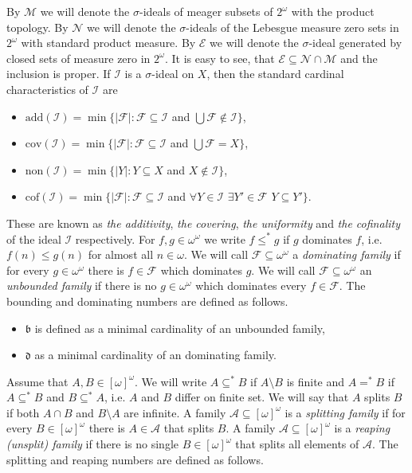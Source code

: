 \documentclass[a4paper]{amsart}
\newcommand{\bbb}{\mathfrak{b}}
\newcommand{\ddd}{\mathfrak{d}}
\newcommand{\Meager}{\mathcal{M}}
\newcommand{\Null}{\mathcal{N}}
\newcommand{\E}{\mathcal{E}}
\newcommand{\Cantor}{2^{\omega}}
\newcommand{\I}{\mathcal{I}}
\begin{document}
By $\Meager$ we will denote the $\sigma$-ideals of meager subsets of $\Cantor$ with the product topology. By $\Null$ we will denote the $\sigma$-ideals of the Lebesgue measure zero sets in $\Cantor$ with standard product measure. By $\E$ we will denote the $\sigma$-ideal generated by closed sets of measure zero in $\Cantor$. It is easy to see, that $\E\subseteq\Null\cap\Meager$ and the inclusion is proper. If $\I$ is a $\sigma$-ideal on $X$, then the standard cardinal characteristics of $\I$ are
\begin{itemize}
    \item[--] $\mathrm{add}(\I)=\min\{|\mathcal{F}|:\mathcal{F}\subseteq\I$ and $\bigcup\mathcal{F}\notin\I\}$,
    \item[--] $\mathrm{cov}(\I)=\min\{|\mathcal{F}|:\mathcal{F}\subseteq\I$ and $\bigcup\mathcal{F}=X\}$,
    \item[--] $\mathrm{non}(\I)=\min\{|Y|:Y\subseteq X$ and $X\notin\I\}$,
    \item[--] $\mathrm{cof}(\I)=\min\{|\mathcal{F}|:\mathcal{F}\subseteq\I$ and $\forall Y\in\I$ $\exists Y'\in\mathcal{F}$ $Y\subseteq Y'\}$.
\end{itemize}
These are known as \emph{the additivity}, \emph{the covering}, \emph{the uniformity} and \emph{the cofinality} of the ideal $\I$ respectively.
For $f,g\in\omega^{\omega}$ we write $f\leq^{*} g$ if $g$ dominates $f$, i.e. $f(n)\leq g(n)$ for almost all $n\in\omega$. We will call $\mathcal{F}\subseteq\omega^{\omega}$ a \emph{dominating family} if for every $g\in\omega^{\omega}$ there is $f\in\mathcal{F}$ which dominates $g$. We will call $\mathcal{F}\subseteq\omega^{\omega}$ an \emph{unbounded family} if there is no $g\in\omega^{\omega}$ which dominates every $f\in\mathcal{F}$. The bounding and dominating numbers are defined as follows.
\begin{itemize}
    \item[--] $\bbb$ is defined as a minimal cardinality of an unbounded family,
    \item[--] $\ddd$ as a minimal cardinality of an dominating family.
\end{itemize}
Assume that $A,B\in[\omega]^{\omega}$. We will write $A\subseteq^{*}B$ if $A\setminus B$ is finite and $A=^{*}B$ if $A\subseteq^{*}B$ and $B\subseteq^{*}A$, i.e. $A$ and $B$ differ on finite set. We will say that $A$ splits $B$ if both $A\cap B$ and $B\setminus A$ are infinite. A family $\mathcal{A}\subseteq[\omega]^{\omega}$ is a \emph{splitting family} if for every $B\in[\omega]^{\omega}$ there is $A\in\mathcal{A}$ that splits $B$. A family $\mathcal{A}\subseteq[\omega]^{\omega}$ is a \emph{reaping (unsplit) family} if there is no single $B\in[\omega]^{\omega}$ that splits all elements of $\mathcal{A}$. The splitting and reaping numbers are defined as follows. 
\end{document}
